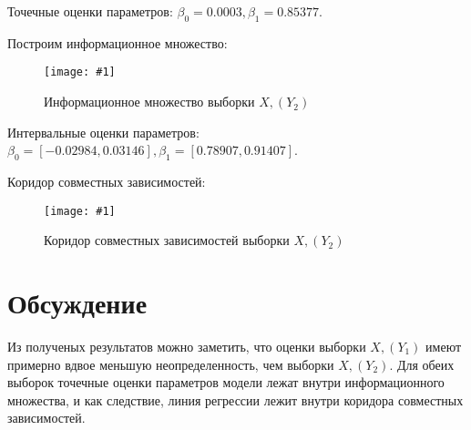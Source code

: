 \documentclass[a4paper,12pt]{article}
\newcommand{\plot}[3]{
    \begin{figure}[H]
        \begin{center}
            \texttt{[image: \#1]}
            \caption{#2}
            \label{#3}
        \end{center}
    \end{figure}
}
\begin{document}
    Точечные оценки параметров: $ \beta_0 = 0.0003, \beta_1 = 0.85377 $.

    Построим информационное множество:
    \plot{img/Inform X, (Y2).png}{Информационное множество выборки $ X, (Y_2) $}{p:infY2}
    
    Интервальные оценки параметров: $ \beta_0 = [-0.02984, 0.03146],
    \beta_1 = [0.78907, 0.91407] $.

    Коридор совместных зависимостей:
    \plot{img/Corridor X, (Y2).png}{Коридор совместных зависимостей выборки $ X, (Y_2) $}{p:corY2}
    
    \section{Обсуждение}
    \quad Из полученых результатов можно заметить, что оценки выборки $ X, (Y_1) $ имеют примерно вдвое меньшую неопределенность, чем выборки $ X, (Y_2) $. Для обеих выборок точечные оценки параметров модели лежат внутри информационного множества, и как следствие, линия регрессии лежит внутри коридора совместных зависимостей.
    
\end{document}
